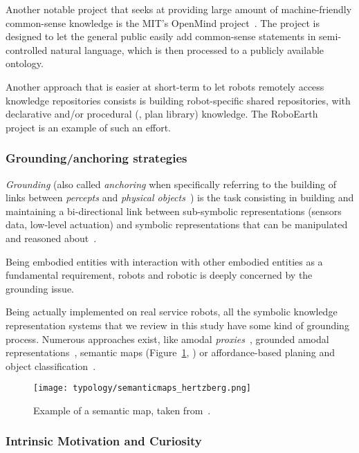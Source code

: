 Another notable project that seeks at providing large amount of
machine-friendly common-sense knowledge is the MIT's OpenMind
project~\cite{Singh2002}. The project is designed to let the general public
easily add common-sense statements in semi-controlled natural language, which is
then processed to a publicly available ontology.

Another approach that is easier at short-term to let robots remotely access
knowledge repositories consists is building robot-specific shared repositories,
with declarative and/or procedural (\ie, plan library) knowledge. The
RoboEarth~\cite{Waibel2011} project is an example of such an effort.

\subsubsection{Grounding/anchoring strategies}
\label{sect|grounding}

\emph{Grounding} (also called \emph{anchoring} when specifically referring to the
building of links between \emph{percepts} and \emph{physical
objects}~\cite{Coradeschi2003}) is the task consisting in building and
maintaining a bi-directional link between sub-symbolic representations (sensors
data, low-level actuation) and symbolic representations that can be
manipulated and reasoned about~\cite{Harnad1990}.

Being embodied entities with interaction with other embodied entities as a
fundamental requirement, robots and robotic is deeply concerned by the
grounding issue.

Being actually implemented on real service robots, all the symbolic knowledge
representation systems that we review in this study have some kind of grounding
process. Numerous approaches exist, like amodal
\emph{proxies}~\cite{Jacobsson2008}, grounded amodal
representations~\cite{Alami2011, Mavridis2006}, semantic maps
(Figure~\ref{fig|semanticmap}, \cite{Nuechter2008, Galindo2008,Blodow2011}) or
affordance-based planing and object classification~\cite{Lorken2008,
Varadarajan2011}.


\begin{figure}
    \centering
    \texttt{[image: typology/semanticmaps\_hertzberg.png]}
    \caption{Example of a semantic map, taken from~\cite{Nuechter2008}.}
    \label{fig|semanticmap}
\end{figure}

\subsubsection{Intrinsic Motivation and Curiosity}

